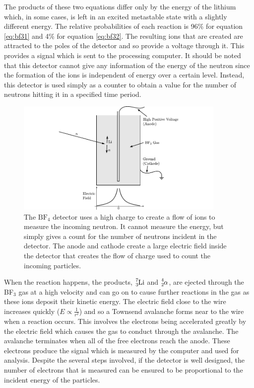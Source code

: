 The products of these two equations differ only by the energy of the lithium which, in some cases, is left in an excited metastable state with a slightly different energy. The relative probabilities of each reaction is 96\% for equation \ref{eq:bf31} and 4\% for equation \ref{eq:bf32}. The resulting ions that are created are attracted to the poles of the detector and so provide a voltage through it. This provides a signal which is sent to the processing computer. It should be noted that this detector cannot give any information of the energy of the neutron since the formation of the ions is independent of energy over a certain level. Instead, this detector is used simply as a counter to obtain a value for the number of neutrons hitting it in a specified time period. 
\begin{figure}[ht]
	\centering
	\includegraphics[width=0.9\textwidth]{BF3detector.pdf}
	\caption{The $\text{BF}_4$ detector uses a high charge to create a flow of ions to measure the incoming neutron. It cannot measure the energy, but simply gives a count for the number of neutrons incident in the detector. The anode and cathode create a large electric field inside the detector that creates the flow of charge used to count the incoming particles.\label{fig:bf3detector}}
\end{figure}

When the reaction happens, the products, $\cf{^7_3 Li}$ and $\cf{^4_2\alpha}$, are ejected through the BF$_3$ gas at a high velocity and can go on to cause further reactions in the gas as these ions deposit their kinetic energy. The electric field close to the wire increases quickly ($E\propto\frac{1}{r^2}$) and so a Townsend avalanche forms near to the wire when a reaction occurs. This involves the electrons being accelerated greatly by the electric field which causes the gas to conduct through the avalanche. The avalanche terminates when all of the free electrons reach the anode. These electrons produce the signal which is measured by the computer and used for analysis. Despite the several steps involved, if the detector is well designed, the number of electrons that is measured can be ensured to be proportional to the incident energy of the particles.


